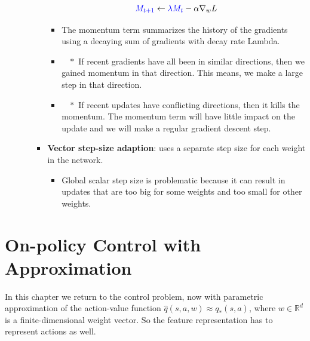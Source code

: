 \documentclass[12pt, a4paper]{article}
\let\stdsection\section
\renewcommand\section{\newpage\stdsection} %
\begin{document}
\begin{itemize}
\begin{itemize}
\begin{itemize}
\begin{gather}
        \textcolor{blue}{M_{t+1}} \leftarrow \textcolor{blue}{\lambda M_t} - \alpha \nabla_w L
      \end{gather}
      \begin{itemize}
        \item The momentum term summarizes the history of the gradients using a decaying sum of gradients with decay rate Lambda.
          \item[] $\;\;\; *$ If recent gradients have all been in similar directions, then we gained momentum in that direction. This means, we make a large step in that direction.
          \item[] $\;\;\; *$ If recent updates have conflicting directions, then it kills the momentum. The momentum term will have little impact on the update and we will make a regular gradient descent step.
      \end{itemize}
      \item \textbf{Vector step-size adaption}: uses a separate step size for each weight in the network.
      \begin{itemize}
        \item Global scalar step size is problematic because it can result in updates that are too big for some weights and too small for other weights.
      \end{itemize}
    \end{itemize}
  \end{itemize}
\end{itemize}

























\section{On-policy Control with Approximation}\label{on-policy-control-with-approximation}

In this chapter we return to the control problem, now with parametric approximation of the action-value function $\hat{q}(s,a,w) \approx q_*(s,a)$, where $w \in \mathbb{R}^d$ is a finite-dimensional weight vector. So the feature representation has to represent actions as well.
\end{document}
